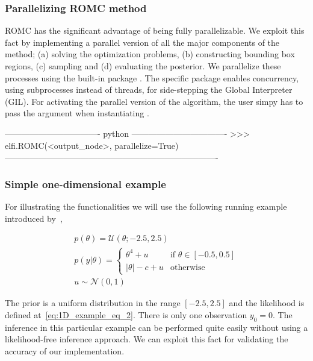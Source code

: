 \subsubsection*{Parallelizing ROMC method}

ROMC has the significant advantage of being fully parallelizable. We
exploit this fact by implementing a parallel version of all the major
components of the method; (a) solving the optimization problems, (b)
constructing bounding box regions, (c) sampling and (d) evaluating the
posterior. We parallelize these processes using the built-in
 package . The specific package
enables concurrency, using subprocesses instead of threads, for
side-stepping the Global Interpreter (GIL). For activating the
parallel version of the algorithm, the user simpy has to pass the
argument  when instantiating .

\begin{Code}
---------------------------------- python ----------------------------------
>>> elfi.ROMC(<output_node>, parallelize=True)
----------------------------------------------------------------------------
\end{Code}
  
\subsubsection*{Simple one-dimensional example}

For illustrating the functionalities we will use the following running
example introduced by~\cite{Ikonomov2019},

\begin{gather} \label{eq:1D_example}
  p(\theta) = \mathcal{U}(\theta;-2.5,2.5)\\ \label{eq:1D_example_eq_2}
  p(y|\theta) = \left\{
    \begin{array}{ll} \theta^4 + u & \mbox{if } \theta \in [-0.5, 0.5]
\\ |\theta| - c + u & \mbox{otherwise}
    \end{array} \right.\\ 
  u \sim \mathcal{N}(0,1)
\end{gather}

\noindent

The prior is a uniform distribution in the range $[-2.5, 2.5]$ and the
likelihood is defined at~\ref{eq:1D_example_eq_2}. There is only one
observation $y_0 = 0$. The inference in this particular example can be
performed quite easily without using a likelihood-free inference
approach. We can exploit this fact for validating the accuracy of our
implementation.

